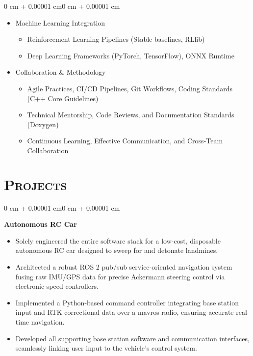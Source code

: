 \documentclass[10pt, letterpaper]{article}
\newenvironment{highlights}{
    \begin{itemize}[
        topsep=0.10 cm,
        parsep=0.10 cm,
        partopsep=0pt,
        itemsep=0pt,
        leftmargin=0.4 cm + 10pt
    ]
}{
    \end{itemize}
}
\newenvironment{onecolentry}{
    \begin{adjustwidth}{0 cm + 0.00001 cm}{0 cm + 0.00001 cm}
}{
    \end{adjustwidth}
}
\begin{document}
\begin{onecolentry}
\begin{itemize}[leftmargin=0.4 cm]
        \item Machine Learning Integration
        \begin{itemize}
            \item Reinforcement Learning Pipelines (Stable baselines, RLlib)
            \item Deep Learning Frameworks (PyTorch, TensorFlow), ONNX Runtime
        \end{itemize}

        \item Collaboration \& Methodology
        \begin{itemize}
            \item Agile Practices, CI/CD Pipelines, Git Workflows, Coding Standards (C++ Core Guidelines)
            \item Technical Mentorship, Code Reviews, and Documentation Standards (Doxygen)
            \item Continuous Learning, Effective Communication, and Cross-Team Collaboration
        \end{itemize}
    \end{itemize}
\end{onecolentry}


\section{\scshape Projects}

\vspace{0.2 cm}

\begin{onecolentry}
    \textbf{Autonomous RC Car}
    \begin{highlights}
        \item Solely engineered the entire software stack for a low-cost, disposable autonomous RC car designed to sweep for and detonate landmines.
        \item Architected a robust ROS 2 pub/sub service-oriented navigation system fusing raw IMU/GPS data for precise Ackermann steering control via electronic speed controllers.
        \item Implemented a Python-based command controller integrating base station input and RTK correctional data over a mavros radio, ensuring accurate real-time navigation.
        \item Developed all supporting base station software and communication interfaces, seamlessly linking user input to the vehicle’s control system.
    \end{highlights}
\end{onecolentry}
\end{document}
